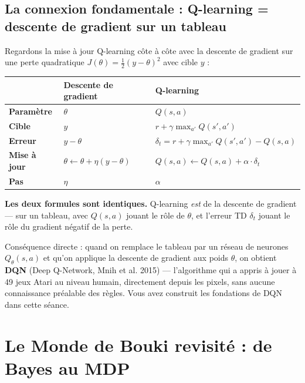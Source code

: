 \documentclass[11pt,a4paper]{article}
\begin{document}
\subsection{La connexion fondamentale : Q-learning = descente de gradient sur un tableau}

Regardons la mise à jour Q-learning côte à côte avec la descente de gradient sur une perte quadratique $J(\theta) = \frac{1}{2}(y - \theta)^2$ avec cible $y$ :

\begin{center}
\renewcommand{\arraystretch}{1.6}
\begin{tabular}{lll}
\toprule
& \textbf{Descente de gradient} & \textbf{Q-learning} \\
\midrule
\textbf{Paramètre} & $\theta$ & $Q(s,a)$ \\
\textbf{Cible} & $y$ & $r + \gamma \max_{a'} Q(s',a')$ \\
\textbf{Erreur} & $y - \theta$ & $\delta_t = r + \gamma \max_{a'} Q(s',a') - Q(s,a)$ \\
\textbf{Mise à jour} & $\theta \leftarrow \theta + \eta(y-\theta)$ & $Q(s,a) \leftarrow Q(s,a) + \alpha \cdot \delta_t$ \\
\textbf{Pas} & $\eta$ & $\alpha$ \\
\bottomrule
\end{tabular}
\end{center}

\textbf{Les deux formules sont identiques.} Q-learning \textit{est} de la descente de gradient --- sur un tableau, avec $Q(s,a)$ jouant le rôle de $\theta$, et l'erreur TD $\delta_t$ jouant le rôle du gradient négatif de la perte.

Conséquence directe : quand on remplace le tableau par un réseau de neurones $Q_\theta(s,a)$ et qu'on applique la descente de gradient aux poids $\theta$, on obtient \textbf{DQN} (Deep Q-Network, Mnih et al. 2015) --- l'algorithme qui a appris à jouer à 49 jeux Atari au niveau humain, directement depuis les pixels, sans aucune connaissance préalable des règles. Vous avez construit les fondations de DQN dans cette séance.

\section{Le Monde de Bouki revisité : de Bayes au MDP}
\end{document}
